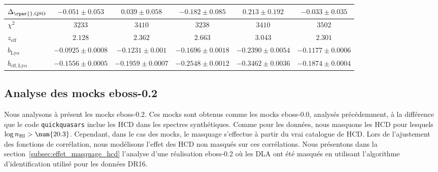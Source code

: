 \begin{table}[h]
\begin{tabular}{lccccc}
$\Delta_{\rpar{}, \textsc{QSO}}$ & $ -0.051 \pm 0.053$ & $ 0.039 \pm 0.058$ & $ -0.182 \pm 0.085$ & $ 0.213 \pm 0.192$ & $ -0.033 \pm 0.035$ \\
\midrule
$\chi^2$ & $ 3233 $ & $ 3410 $ & $ 3238 $ & $ 3410 $ & $ 3502 $ \\
$z_{\mathrm{eff}}$ & $ 2.128 $ & $ 2.362 $ & $ 2.663 $ & $ 3.043 $ & $ 2.301 $ \\
\midrule
$b_{\mathrm{Ly}\alpha} $ & $ -0.0925 \pm 0.0008$ & $ -0.1231 \pm 0.001$ & $ -0.1696 \pm 0.0018$ & $ -0.2390 \pm 0.0054$ & $ -0.1177 \pm 0.0006$ \\
$b_{\mathrm{eff}, \mathrm{Ly}\alpha} $ & $ -0.1556 \pm 0.0005$ & $ -0.1959 \pm 0.0007$ & $ -0.2548 \pm 0.0012$ & $ -0.3462 \pm 0.0036$ & $ -0.1874 \pm 0.0004$ \\
\bottomrule
  \end{tabular}
\end{table}


\newpage
\subsection{Analyse des mocks eboss-0.2}
\label{subsec:ana_eboss-0.2}
Nous analysons à présent les mocks eboss-0.2. Ces mocks sont obtenus comme les mocks eboss-0.0, analysés précédemment, à la différence que le code \texttt{quickquasars} inclue les HCD dans les spectres synthétiques.
Comme pour les données, nous masquons les HCD pour lesquels $\log n_{\textsc{HI}} > \num{20.3}$. Cependant, dans le cas des mocks, le masquage s'effectue à partir du vrai catalogue de HCD.
Lors de l'ajustement des fonctions de corrélation, nous modélisons l'effet des HCD non masqués sur ces corrélations.
Nous présentons dans la section~\ref{subsec:effet_masquage_hcd} l'analyse d'une réalisation eboss-0.2 où les DLA ont été masqués en utilisant l'algorithme d'identification utilisé pour les données DR16.


